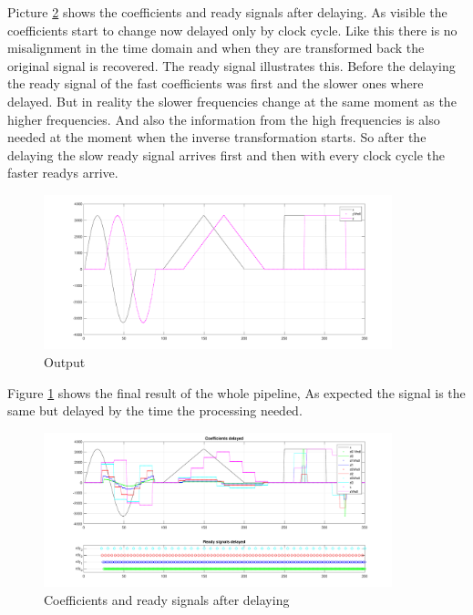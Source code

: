 \begin{refsection}
Picture \ref{fpga:fig:coeff_delayed} shows the coefficients and ready signals after delaying. 
As visible the coefficients start to change now delayed only by clock cycle. 
Like this there is no misalignment in the time domain and when they are transformed back the original signal is recovered. 
The ready signal illustrates this. 
Before the delaying the ready signal of the fast coefficients was first and the slower ones where delayed. 
But in reality the slower frequencies change at the same moment as the higher frequencies. 
And also the information from the high frequencies is also needed at the moment when the inverse transformation starts. 
So after the delaying the slow ready signal arrives first and then with every clock cycle the faster readys arrive. 
\begin{figure}[h]
	\centering
	\includegraphics[width=0.9\textwidth]{papers/fpga/images/output.pdf}
	\caption{Output \label{fpga:fig:output}}
\end{figure}

Figure \ref{fpga:fig:output} shows the final result of the whole pipeline, As expected the signal is the same but delayed by the time the processing needed. 
\begin{figure}[h]
	\centering
	\includegraphics[width=0.9\textwidth]{papers/fpga/images/coefs_delayed.pdf}
	\caption{Coefficients and ready signals after delaying \label{fpga:fig:coeff_delayed}}
\end{figure}


\end{refsection}
